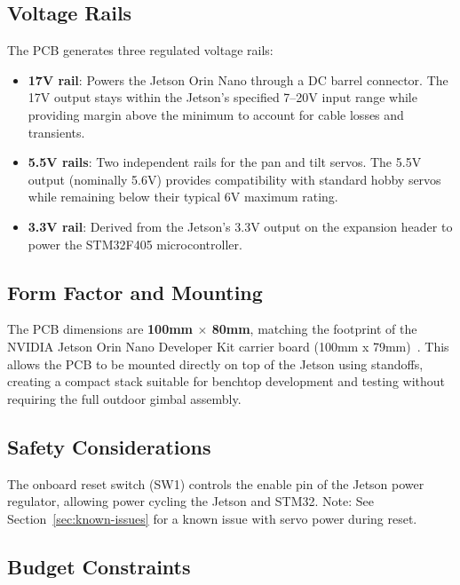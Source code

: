\documentclass[12pt, titlepage]{article}
\begin{document}
\subsection{Voltage Rails}

The PCB generates three regulated voltage rails:

\begin{itemize}[leftmargin=*]
  \item \textbf{17V rail}: Powers the Jetson Orin Nano through a DC
        barrel connector. The 17V output stays within the Jetson's
        specified 7--20V input range while providing margin above the
        minimum to account for cable losses and transients.
  \item \textbf{5.5V rails}: Two independent rails for the pan and
        tilt servos. The 5.5V output (nominally 5.6V) provides
        compatibility with standard hobby servos while remaining below
        their typical 6V maximum rating.
  \item \textbf{3.3V rail}: Derived from the Jetson's 3.3V output on
        the expansion header to power the STM32F405 microcontroller.
\end{itemize}

\subsection{Form Factor and Mounting}

The PCB dimensions are \textbf{100mm $\times$ 80mm}, matching the footprint of
the NVIDIA Jetson Orin Nano Developer Kit carrier board (100mm x
79mm)~\citep{Nvidia_JetsonOrinNano_DevKit_Spec_2024}. This allows the PCB to be
mounted directly on top of the Jetson using standoffs, creating a compact stack
suitable for benchtop development and testing without requiring the full
outdoor gimbal assembly.

\subsection{Safety Considerations}

The onboard reset switch (SW1) controls the enable pin of the Jetson power
regulator, allowing power cycling the Jetson and STM32. Note: See
Section~\ref{sec:known-issues} for a known issue with servo power during reset.

\subsection{Budget Constraints}
\end{document}
